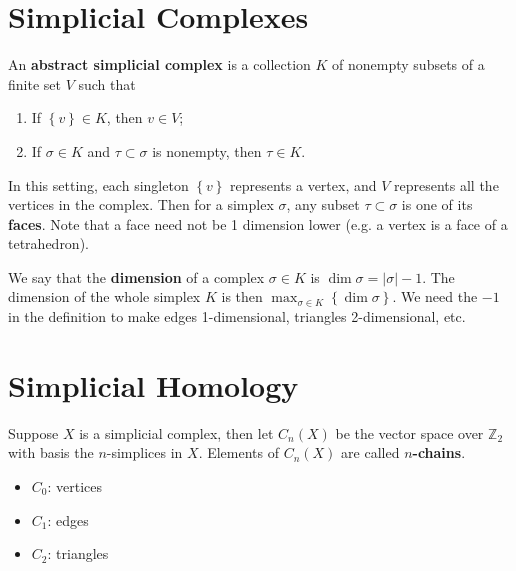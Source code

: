 \documentclass[twoside,10pt]{report}
\begin{document}
\section{Simplicial Complexes}

\begin{defn}[]
	An \textbf{abstract simplicial complex} is a collection $K$ of nonempty subsets of a finite set $V$ such that
	\begin{enumerate}
		\item If $\left\{ v \right\} \in K$, then $v \in V$;
		\item If $\sigma \in K$ and $\tau \subset \sigma$ is nonempty, then $\tau \in K$.
	\end{enumerate}
\end{defn}

In this setting, each singleton $\left\{ v \right\}$ represents a vertex, and $V$ represents all the vertices in the complex. Then for a simplex $\sigma$, any subset $\tau \subset \sigma$ is one of its \textbf{faces}. Note that a face need not be 1 dimension lower (e.g. a vertex is a face of a tetrahedron).

We say that the \textbf{dimension} of a complex $\sigma \in K$ is $\dim \sigma = |\sigma|-1$. The dimension of the whole simplex $K$ is then $\max_{\sigma\in K}\left\{ \dim \sigma \right\}$. We need the $-1$ in the definition to make edges 1-dimensional, triangles 2-dimensional, etc.

\section{Simplicial Homology}

\begin{defn}[]
	Suppose $X$ is a simplicial complex, then let $C_{n}(X)$ be the vector space over $\mathbb{Z}_{2}$ with basis the $n$-simplices in $X$. Elements of $C_{n}(X)$ are called \textbf{$n$-chains}.
\end{defn}

\begin{itemize}
	\item $C_{0}$: vertices
	\item $C_{1}$: edges
	\item $C_{2}$: triangles
\end{itemize}
\end{document}
